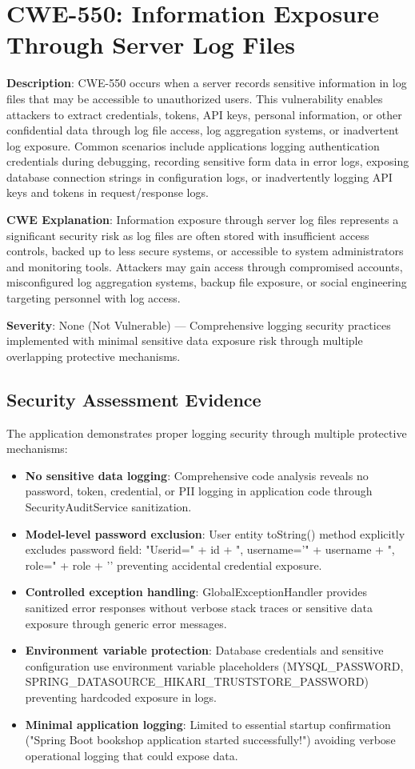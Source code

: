 \documentclass[]{UCD_CS_FYP_Report}
\begin{document}
\section{CWE-550: Information Exposure Through Server Log Files}

\textbf{Description}: CWE-550 occurs when a server records sensitive information in log files that may be accessible to unauthorized users. This vulnerability enables attackers to extract credentials, tokens, API keys, personal information, or other confidential data through log file access, log aggregation systems, or inadvertent log exposure. Common scenarios include applications logging authentication credentials during debugging, recording sensitive form data in error logs, exposing database connection strings in configuration logs, or inadvertently logging API keys and tokens in request/response logs.

\textbf{CWE Explanation}: Information exposure through server log files represents a significant security risk as log files are often stored with insufficient access controls, backed up to less secure systems, or accessible to system administrators and monitoring tools. Attackers may gain access through compromised accounts, misconfigured log aggregation systems, backup file exposure, or social engineering targeting personnel with log access.

\textbf{Severity}: None (Not Vulnerable) — Comprehensive logging security practices implemented with minimal sensitive data exposure risk through multiple overlapping protective mechanisms.

\subsection*{Security Assessment Evidence}
The application demonstrates proper logging security through multiple protective mechanisms:
\begin{itemize}
	\item \textbf{No sensitive data logging}: Comprehensive code analysis reveals no password, token, credential, or PII logging in application code through SecurityAuditService sanitization.
	\item \textbf{Model-level password exclusion}: User entity toString() method explicitly excludes password field: "User{id=" + id + ", username='" + username + ", role=" + role + '}' preventing accidental credential exposure.
	\item \textbf{Controlled exception handling}: GlobalExceptionHandler provides sanitized error responses without verbose stack traces or sensitive data exposure through generic error messages.
	\item \textbf{Environment variable protection}: Database credentials and sensitive configuration use environment variable placeholders (MYSQL\_PASSWORD, SPRING\_DATASOURCE\_HIKARI\_TRUSTSTORE\_PASSWORD) preventing hardcoded exposure in logs.
	\item \textbf{Minimal application logging}: Limited to essential startup confirmation ("Spring Boot bookshop application started successfully!") avoiding verbose operational logging that could expose data.
\end{itemize}
\end{document}
